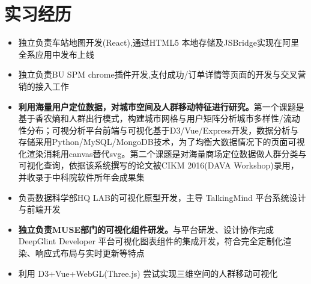 \documentclass{resume}
\begin{document}

\section{实习经历}
\begin{itemize}
  \item 独立负责车站地图开发(React),通过HTML5 本地存储及JSBridge实现在阿里全系应用中发布上线
  \item 独立负责BU SPM chrome插件开发,支付成功/订单详情等页面的开发与交叉营销的接入工作
\end{itemize}

\begin{itemize}
  \item \textbf{利用海量用户定位数据，对城市空间及人群移动特征进行研究。}第一个课题是基于香农熵和人群出行模式，构建城市网格与用户矩阵分析城市多样性/流动性分布；可视分析平台前端与可视化基于D3/Vue/Express开发，数据分析与存储采用Python/MySQL/MongoDB技术，为了均衡大数据情况下的页面可视化渲染消耗用canvas替代svg。第二个课题是对海量商场定位数据做人群分类与可视化查询，依据该系统撰写的论文被CIKM 2016(DAVA Workshop)录用，并收录于中科院软件所年会成果集
  \item 负责数据科学部HQ LAB的可视化原型开发，主导 TalkingMind 平台系统设计与前端开发
\end{itemize}

\begin{itemize}
  \item \textbf{独立负责MUSE部门的可视化组件研发。}与平台研发、设计协作完成 DeepGlint Developer 平台可视化图表组件的集成开发，符合完全定制化渲染、响应式布局与实时更新等特点
  \item 利用 D3+Vue+WebGL(Three.js) 尝试实现三维空间的人群移动可视化
\end{itemize}


\end{document}
